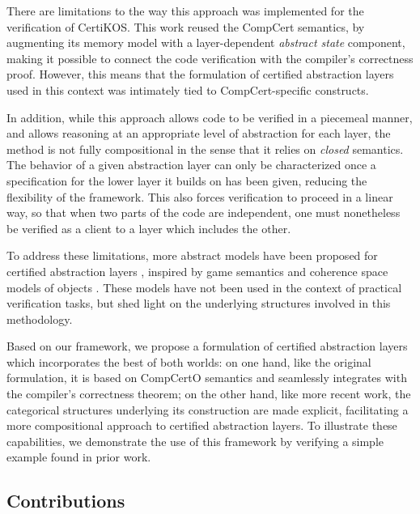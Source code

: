 \documentclass[acmsmall,screen,review,anonymous]{acmart}
\begin{document}
There are limitations to the way this approach
was implemented for the verification of CertiKOS.
This work reused the CompCert semantics,
by augmenting its memory model
with a layer-dependent \emph{abstract state} component,
making it possible to connect the code verification
with the compiler's correctness proof.
However,
this means that the formulation of certified abstraction layers
used in this context
was intimately tied to CompCert-specific constructs.

In addition,
while this approach allows code
to be verified in a piecemeal manner,
and allows reasoning at an appropriate level of abstraction
for each layer,
the method is not fully compositional
in the sense that it relies on \emph{closed} semantics.
The behavior of a given abstraction layer
can only be characterized
once a specification for the lower layer it builds on has been given,
reducing the flexibility of the framework.
This also forces verification to proceed
in a linear way,
so that when two parts of the code
are independent,
one must nonetheless be verified
as a client to a layer which includes the other.

To address these limitations,
more abstract models have been proposed
for certified abstraction layers
\cite{rbgs-cal,popl22},
inspired by game semantics and
coherence space models of objects \cite{objsem}.
These models have not been used
in the context of practical verification tasks,
but shed light on the underlying structures
involved in this methodology.

Based on our framework,
we propose a formulation of certified abstraction layers
which incorporates the best of both worlds:
on one hand,
like the original formulation,
it is based on CompCertO semantics
and seamlessly integrates
with the compiler's correctness theorem;
on the other hand,
like more recent work,
the categorical structures underlying its construction
are made explicit,
facilitating a more compositional approach
to certified abstraction layers.
To illustrate these capabilities,
we demonstrate the use of this framework
by verifying a simple example
found in prior work.


\subsection{Contributions} %
\end{document}

